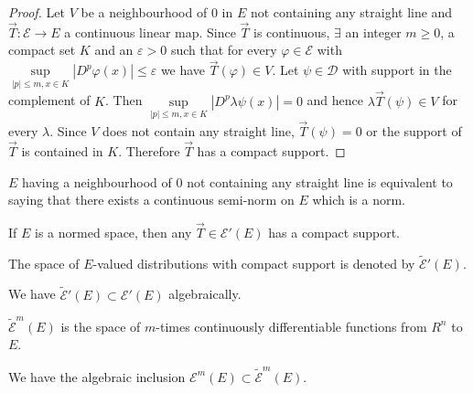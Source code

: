 \begin{proof}
Let $V$ be a neighbourhood of $0$ in $E$ not containing any straight
line and $\overrightarrow{T} : \mathscr{E} \to E$ a continuous linear
map. Since $\overrightarrow{T}$ is continuous, $\exists$ an integer $m
\geq 0$, a compact set $K$ and an $\varepsilon > 0$ such that for every
$\varphi \in \mathscr{E}$ with $\sup \limits_{|p|\leq m, x \in
  K} |D^p \varphi (x)| \leq \varepsilon$ we have $\overrightarrow{T} (\varphi)
\in V$. Let $\psi \in \mathscr{D}$ with support in the
complement of $K$. Then $\sup \limits_{|p|\leq m, x \in K} |D^p
\lambda \psi (x)|=0$ and hence $\lambda \overrightarrow{T} (\psi)
\in V$ for every $\lambda$. Since $V$ does not contain any
straight line, $\overrightarrow{T} (\psi)=0$ or the support of
$\overrightarrow{T}$ is contained in $K$. Therefore
$\overrightarrow{T}$ has a compact support.  
\end{proof}

\begin{coro*}
$E$ having a neighbourhood of $0$ not containing any straight line is
  equivalent to saying that there exists a continuous semi-norm on $E$
  which is a norm.

If $E$ is a normed space, then any $\overrightarrow{T} \in
\mathscr{E}'(E)$ has a compact support.
\end{coro*}

\begin{definition}\label{chap5:def5.3}
The space of $E$-valued distributions with compact support is denoted
by $\tilde{\mathcal{E}}' (E)$.

We have $\tilde{\mathscr{E}}' (E) \subset \mathscr{E}' (E)$ algebraically.
\end{definition}

\begin{definition}\label{chap5:def5.4}
$\tilde{\mathscr{E}}^m (E)$ is the space of $m$-times continuously
  differentiable functions from $R^n$ to $E$.
\end{definition}

\begin{prop}\label{chap5:prop5.4}
We have the algebraic inclusion $\mathscr{E}^m(E)
\subset\tilde{\mathscr{E}}^m(E)$. 
\end{prop}

